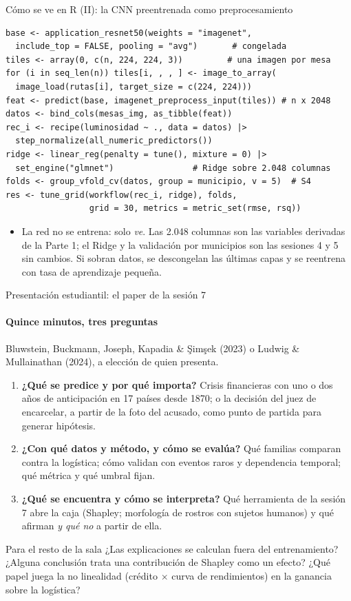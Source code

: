 \documentclass{beamer}
\newcommand{\1}{\mathbb{I}}
\begin{document}
\begin{frame}[fragile]{Cómo se ve en R (II): la CNN preentrenada como preprocesamiento}
\scriptsize
\begin{verbatim}
base <- application_resnet50(weights = "imagenet",
  include_top = FALSE, pooling = "avg")       # congelada
tiles <- array(0, c(n, 224, 224, 3))         # una imagen por mesa
for (i in seq_len(n)) tiles[i, , , ] <- image_to_array(
  image_load(rutas[i], target_size = c(224, 224)))
feat <- predict(base, imagenet_preprocess_input(tiles)) # n x 2048
datos <- bind_cols(mesas_img, as_tibble(feat))
rec_i <- recipe(luminosidad ~ ., data = datos) |>
  step_normalize(all_numeric_predictors())
ridge <- linear_reg(penalty = tune(), mixture = 0) |>
  set_engine("glmnet")                # Ridge sobre 2.048 columnas
folds <- group_vfold_cv(datos, group = municipio, v = 5)  # S4
res <- tune_grid(workflow(rec_i, ridge), folds,
                 grid = 30, metrics = metric_set(rmse, rsq))
\end{verbatim}
\normalsize
\small
\begin{itemize}\itemsep2pt
  \item La red no se entrena: solo \emph{ve}. Las 2.048 columnas son las variables derivadas de la Parte 1; el Ridge y la validación por municipios son las sesiones 4 y 5 sin cambios. Si sobran datos, se descongelan las últimas capas y se reentrena con tasa de aprendizaje pequeña.
\end{itemize}
\end{frame}

\begin{frame}{Presentación estudiantil: el paper de la sesión 7}
\framesubtitle{Quince minutos, tres preguntas}
\small
Bluwstein, Buckmann, Joseph, Kapadia \& Şimşek (2023) o Ludwig \& Mullainathan (2024), a elección de quien presenta.
\begin{enumerate}\itemsep3pt
  \item \textbf{¿Qué se predice y por qué importa?} Crisis financieras con uno o dos años de anticipación en 17 países desde 1870; o la decisión del juez de encarcelar, a partir de la foto del acusado, como punto de partida para generar hipótesis.
  \item \textbf{¿Con qué datos y método, y cómo se evalúa?} Qué familias comparan contra la logística; cómo validan con eventos raros y dependencia temporal; qué métrica y qué umbral fijan.
  \item \textbf{¿Qué se encuentra y cómo se interpreta?} Qué herramienta de la sesión 7 abre la caja (Shapley; morfología de rostros con sujetos humanos) y qué afirman \emph{y qué no} a partir de ella.
\end{enumerate}
\pause
\begin{block}{Para el resto de la sala}
¿Las explicaciones se calculan fuera del entrenamiento? ¿Alguna conclusión trata una contribución de Shapley como un efecto? ¿Qué papel juega la no linealidad (crédito $\times$ curva de rendimientos) en la ganancia sobre la logística?
\end{block}
\end{frame}
\end{document}
